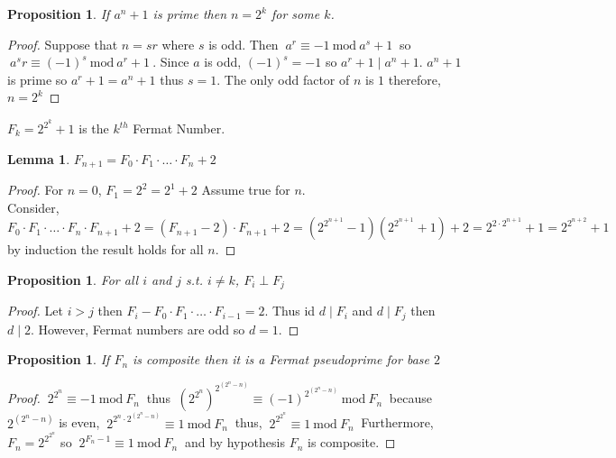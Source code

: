 \documentclass[12pt]{extarticle}
\renewcommand\qedsymbol{$\square$}
\newcommand{\divides}{\mid}
\newtheorem{lemma}[theorem]{Lemma}
\newtheorem{proposition}[theorem]{Proposition}
\newenvironment{definition}[1][Definition:]{\begin{trivlist}
\item[\hskip \labelsep {\bfseries #1}]}{\end{trivlist}}
\newenvironment{lproof}{\begin{proof} \renewcommand{\qedsymbol}{}}{\end{proof}}
\renewcommand{\mod}[3]{\: #1 \equiv #2 \: \mathrm{mod} \: #3 \:}
\begin{document}
\begin{proposition}
If $a^n + 1$ is prime then $n = 2^k$ for some $k$.
\end{proposition}

\begin{lproof}
Suppose that $n = sr$ where $s$ is odd. Then $\mod{a^r}{-1}{a^s+1}$ so \\ $\mod{a^sr}{(-1)^s}{a^r+1}$. Since $a$ is odd, $(-1)^s = -1$ so $a^r + 1 \divides a^n + 1$. $a^n + 1$ is prime so $a^r + 1 = a^n + 1$ thus $s = 1$. The only odd factor of $n$ is $1$ therefore, $n = 2^k$
\end{lproof}

\begin{definition}
$F_k = 2^{2^k} + 1$ is the $k^{th}$ Fermat Number.
\end{definition}

\begin{lemma}
$F_{n+1} = F_0 \cdot F_1 \cdot \ldots \cdot F_n + 2$
\end{lemma}

\begin{lproof}
For $n = 0$, $F_1 = 2^2 = 2^1 + 2$ Assume true for $n$. \\ Consider, $F_0 \cdot F_1 \cdot \ldots \cdot F_n \cdot F_{n+1} + 2 = (F_{n+1} - 2) \cdot F_{n+1} + 2 = (2^{2^{n+1}} - 1)(2^{2^{n+1}} + 1) + 2 = 2^{2 \cdot 2^{n+1}} + 1 = 2^{2^{n+2}} + 1$ by induction the result holds for all $n$.  
\end{lproof}

\begin{proposition}
For all $i$ and $j$ s.t. $i \neq k$, $F_i \perp F_j$ 
\end{proposition}

\begin{lproof}
Let $i > j$ then $F_i - F_0 \cdot F_1 \cdot \ldots \cdot F_{i-1} = 2$. Thus id $d \divides F_i$ and $d \divides F_j$ then $d \divides 2$. However, Fermat numbers are odd so $d = 1$. 
\end{lproof}

\begin{proposition}
If $F_n$ is composite then it is a Fermat pseudoprime for base $2$  
\end{proposition}

\begin{lproof}
$\mod{2^{2^n}}{-1}{F_n}$ thus $\mod{(2^{2^n})^{2^{(2^n-n)}}}{(-1)^{2^{(2^n-n)}}}{F_n}$ because $2^{(2^n-n)}$ is even, $\mod{2^{2^n \cdot 2^{(2^n-n)}}}{1}{F_n}$ thus, $\mod{2^{2^{2^n}}}{1}{F_n}$ Furthermore, $F_n = 2^{2^{2^n}}$ so $\mod{2^{F_n - 1}}{1}{F_n}$ and by hypothesis $F_n$ is composite.  
\end{lproof}
\end{document}
